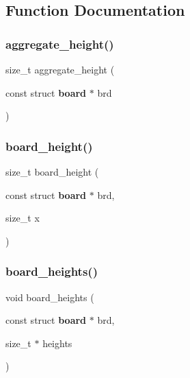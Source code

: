 \subsection{Function Documentation}
\mbox{\label{tools_8c_af641e6b38f455ac3f9f1a5f49d3bc787}} 
\subsubsection{aggregate\+\_\+height()}
{\footnotesize\ttfamily size\+\_\+t aggregate\+\_\+height (\begin{DoxyParamCaption}\item[{const struct \textbf{ board} $\ast$}]{brd }\end{DoxyParamCaption})\hspace{0.3cm}{\ttfamily [inline]}}

\mbox{\label{tools_8c_a4ca7e6505b351ba190d31948268ff2cb}} 
\subsubsection{board\+\_\+height()}
{\footnotesize\ttfamily size\+\_\+t board\+\_\+height (\begin{DoxyParamCaption}\item[{const struct \textbf{ board} $\ast$}]{brd,  }\item[{size\+\_\+t}]{x }\end{DoxyParamCaption})\hspace{0.3cm}{\ttfamily [inline]}}

\mbox{\label{tools_8c_ab2be749cc3ff926d84d4d19b40db0c5f}} 
\subsubsection{board\+\_\+heights()}
{\footnotesize\ttfamily void board\+\_\+heights (\begin{DoxyParamCaption}\item[{const struct \textbf{ board} $\ast$}]{brd,  }\item[{size\+\_\+t $\ast$}]{heights }\end{DoxyParamCaption})\hspace{0.3cm}{\ttfamily [inline]}}

